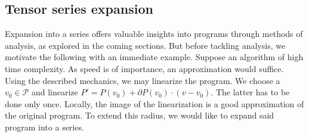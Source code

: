 \documentclass{article}
\newcommand{\dP}{\mathcal{P}}
\newcommand{\D}{\partial}
\begin{document}
 \subsection{Tensor series expansion}\label{sec:Vrsta}
 
 Expansion into a series offers valuable insights into programs through methods of analysis, as explored in the coming sections. But before tackling analysis, we motivate the following with an immediate example. Suppose an algorithm of high time complexity. As speed is of importance, an approximation would suffice. Using the described mechanics, we may linearize the program. We choose a $v_0\in\dP$ and linearize $P'=P(v_0)+\D P(v_0)\cdot(v-v_0)$. The latter has to be done only once.
 Locally, the image of the linearization is a good approximation of the original program. To extend this radius, we would like to expand said program into a series.
 
\end{document}
